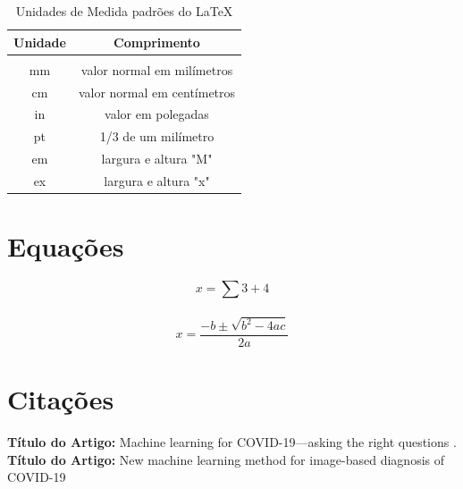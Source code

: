 \documentclass{article}
\begin{document}
\begin{table}[htb]
    \centering
    \begin{tabular}{c|c}
         \textbf{Unidade} & \textbf{Comprimento} \\
         \hline \\
         
         mm & valor normal em milímetros \\
         cm & valor normal em centímetros \\
         in & valor em polegadas \\
         pt & 1/3 de um milímetro \\
         em & largura e altura "M" \\
         ex & largura e altura "x"
    \end{tabular}
    \caption{Unidades de Medida padrões do \LaTeX}
    \label{tab:my_label}
\end{table}

\section{Equações}
\begin{equation}
    x = \sum{3+4}
\end{equation} \\

\begin{equation}
    x = \frac{-b \pm \sqrt{b^2 - 4ac}}{2a}
\end{equation}

\section{Citações}
\textbf{Título do Artigo:} Machine learning for COVID-19—asking the right questions \cite{ZHANG2016}. \\

\textbf{Título do Artigo:} New machine learning method for image-based diagnosis of COVID-19 \cite{YASSIN2018}



\end{document}
